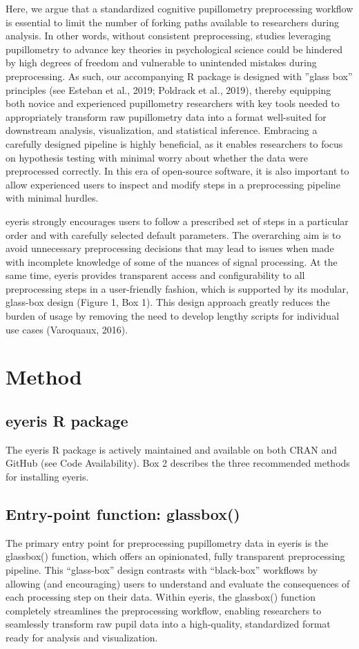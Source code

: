 Here, we argue that a standardized cognitive pupillometry preprocessing workflow is essential to limit the number of forking paths available to researchers during analysis. In other words, without consistent preprocessing, studies leveraging pupillometry to advance key theories in psychological science could be hindered by high degrees of freedom and vulnerable to unintended mistakes during preprocessing. As such, our accompanying R package is designed with ”glass box” principles (see Esteban et al., 2019; Poldrack et al., 2019), thereby equipping both novice and experienced pupillometry researchers with key tools needed to appropriately transform raw pupillometry data into a format well-suited for downstream analysis, visualization, and statistical inference. Embracing a carefully designed pipeline is highly beneficial, as it enables researchers to focus on hypothesis testing with minimal worry about whether the data were preprocessed correctly. In this era of open-source software, it is also important to allow experienced users to inspect and modify steps in a preprocessing pipeline with minimal hurdles.

eyeris strongly encourages users to follow a prescribed set of steps in a particular order and with carefully selected default parameters. The overarching aim is to avoid unnecessary preprocessing decisions that may lead to issues when made with incomplete knowledge of some of the nuances of signal processing. At the same time, eyeris provides transparent access and configurability to all preprocessing steps in a user-friendly fashion, which is supported by its modular, glass-box design (Figure 1, Box 1). This design approach greatly reduces the burden of usage by removing the need to develop lengthy scripts for individual use cases (Varoquaux, 2016).

\section{Method}
\subsection{eyeris R package}
The eyeris R package is actively maintained and available on both CRAN and GitHub (see Code Availability). Box 2 describes the three recommended methods for installing eyeris.

\subsection{Entry-point function: glassbox()}
The primary entry point for preprocessing pupillometry data in eyeris is the glassbox() function, which offers an opinionated, fully transparent preprocessing pipeline. This “glass-box” design contrasts with “black-box” workflows by allowing (and encouraging) users to understand and evaluate the consequences of each processing step on their data. Within eyeris, the glassbox() function completely streamlines the preprocessing workflow, enabling researchers to seamlessly transform raw pupil data into a high-quality, standardized format ready for analysis and visualization.

